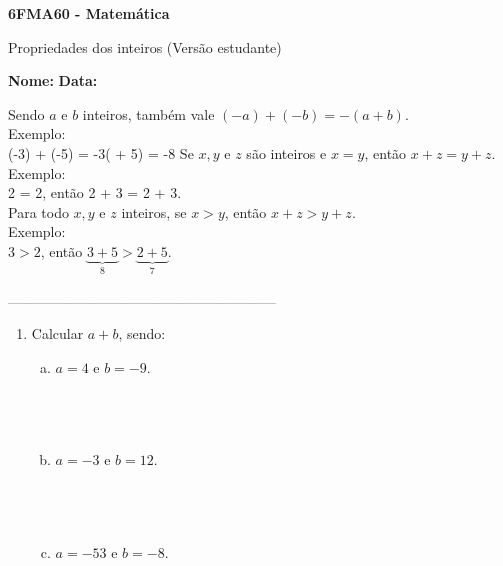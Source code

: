 \documentclass[a4paper,14pt]{article}
\begin{document}
	
	\noindent\textbf{6FMA60 - Matemática} 
	
	\begin{center}Propriedades dos inteiros (Versão estudante)
	\end{center}
	
	\noindent\textbf{Nome:} \underline{\hspace{10cm}}
	\noindent\textbf{Data:} \underline{\hspace{4cm}}
	
	\begin{multicols}{2}
    		\noindent Sendo $a$ e $b$ inteiros, também vale $(-a) + (-b) = -(a + b)$. \\
    		Exemplo: \\
    		(-3) + (-5) = -3( + 5) = -8
    		Se $x, y$ e $z$ são inteiros e $x = y$, então $x + z = y + z$.	\\
    		Exemplo: \\
    		2 = 2, então 2 + 3 = 2 + 3. \\
    		Para todo $x, y$ e $z$ inteiros, se $x > y$, então $x + z > y + z$. \\
    		Exemplo: \\
    		$3 > 2$, então $\underbrace{3 + 5}_\text{8} > \underbrace{2 + 5}_\text{7}$.  \\\\
    		\textsubscript{---------------------------------------------------------------------}
    		\begin{enumerate}
    			\item Calcular $a + b$, sendo:
    			\begin{enumerate}[a)]
    				\item $a = 4$ e $b = -9$. \\\\\\\\
    				\item $a = -3$ e $b = 12$. \\\\\\\\
    				\item $a = -53$ e $b = -8$. \\\\\\\\

\end{enumerate}
\end{enumerate}
\end{multicols}
\end{document}

